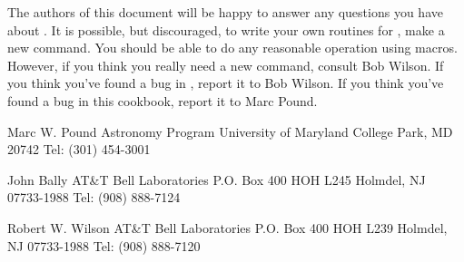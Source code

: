 The authors of this document will be happy to answer any questions 
you have about \C.  
It is possible, but discouraged, to write your own routines for \C, \ie
make a new command. You should be able to do any reasonable operation using
macros. However, if you think you really need a new \COMB command, consult
Bob Wilson.
If you think you've found a bug in \C, report it to Bob Wilson.
If you think you've found a bug in this cookbook, report it to Marc Pound.
 
\smallskip \noindent
Marc W. Pound\hfill\break
Astronomy Program\hfill\break
University of Maryland\hfill\break
College Park, MD 20742\hfill\break
Tel: (301) 454-3001\hfill\break

\noindent 
John Bally\hfill\break
AT\&T Bell Laboratories\hfill\break 
P.O. Box 400\hfill\break 
HOH L245\hfill\break 
Holmdel, NJ 07733-1988\hfill\break
Tel: (908) 888-7124\hfill\break

\noindent 
Robert W. Wilson\hfill\break
AT\&T Bell Laboratories\hfill\break
P.O. Box 400\hfill\break
HOH L239\hfill\break
Holmdel, NJ 07733-1988\hfill\break
Tel: (908) 888-7120\hfill\break

